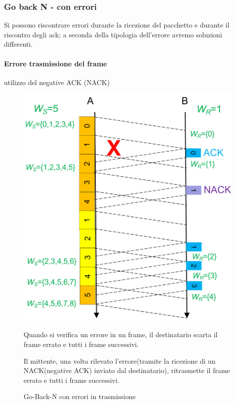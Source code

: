 \subsubsection{Go back N - con errori}
Si possono riscontrare errori durante la ricezione del pacchetto e durante il riscontro degli ack; a seconda della tipologia dell'errore avremo soluzioni differenti.
\paragraph{Errore trasmissione del frame} utilizzo del negative ACK (NACK)
\begin{figure}[htbp]
    \centering
    \begin{minipage}{0.4\textwidth}
        \includegraphics[width=\linewidth]{images/gobackinerrori.png}
        \caption{Go-Back-N con errori in trasmissione}
    \end{minipage}%
    \hfill
    \begin{minipage}{0.55\textwidth}
        Quando si verifica un errore in un frame, il destinatario scarta il frame errato e tutti i frame successivi. 
        
        Il mittente, una volta rilevato l'errore(tramite la ricezione di un NACK(negative ACK) inviato dal destinatario), ritrasmette il frame errato e tutti i frame successivi.
    \end{minipage}
\end{figure}

